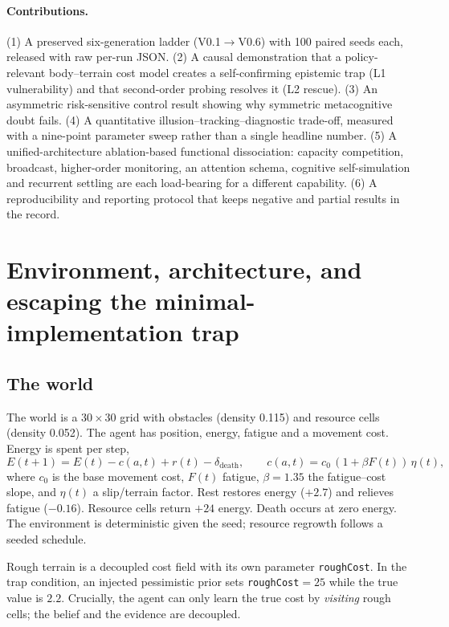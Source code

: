 \documentclass{article}
\begin{document}
\paragraph{Contributions.}
(1) A preserved six-generation ladder (V0.1$\rightarrow$V0.6) with 100 paired seeds each, released with raw per-run JSON. (2) A causal demonstration that a policy-relevant body--terrain cost model creates a self-confirming epistemic trap (L1 vulnerability) and that second-order probing resolves it (L2 rescue). (3) An asymmetric risk-sensitive control result showing why symmetric metacognitive doubt fails. (4) A quantitative illusion--tracking--diagnostic trade-off, measured with a nine-point parameter sweep rather than a single headline number. (5) A unified-architecture ablation-based functional dissociation: capacity competition, broadcast, higher-order monitoring, an attention schema, cognitive self-simulation and recurrent settling are each load-bearing for a different capability. (6) A reproducibility and reporting protocol that keeps negative and partial results in the record.

\section{Environment, architecture, and escaping the minimal-implementation trap}

\subsection{The world}

The world is a $30\times30$ grid with obstacles (density 0.115) and resource cells (density 0.052). The agent has position, energy, fatigue and a movement cost. Energy is spent per step,
\begin{equation}
E(t+1) = E(t) - c(a,t) + r(t) - \delta_{\mathrm{death}},
\qquad
c(a,t) = c_0\,(1+\beta F(t))\,\eta(t),
\end{equation}
where $c_0$ is the base movement cost, $F(t)$ fatigue, $\beta=1.35$ the fatigue--cost slope, and $\eta(t)$ a slip/terrain factor. Rest restores energy ($+2.7$) and relieves fatigue ($-0.16$). Resource cells return $+24$ energy. Death occurs at zero energy. The environment is deterministic given the seed; resource regrowth follows a seeded schedule.

Rough terrain is a decoupled cost field with its own parameter \texttt{roughCost}. In the trap condition, an injected pessimistic prior sets \texttt{roughCost}$=25$ while the true value is $2.2$. Crucially, the agent can only learn the true cost by \emph{visiting} rough cells; the belief and the evidence are decoupled.
\end{document}

